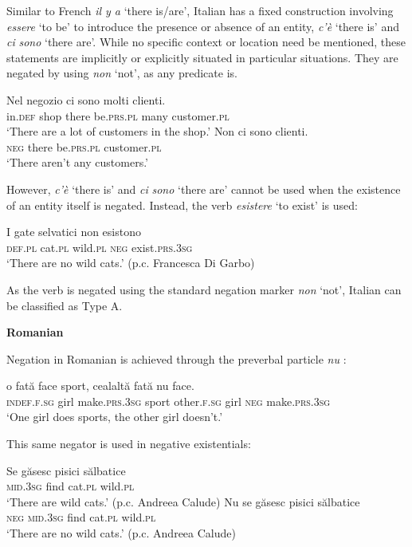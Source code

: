 ﻿\documentclass[output=paper]{langsci/langscibook}
\begin{document}
\begin{unindented}
Similar to French \textit{il y a} `there is/are', Italian has a fixed construction involving \textit{essere} `to be' to introduce the presence or absence of an entity, \textit{c’è} `there is' and \textit{ci} \textit{sono} `there are'. While no specific context or location need be mentioned, these statements are implicitly or explicitly situated in particular situations. They are negated by using \textit{non} `not', as any predicate is. 
%
\begin{exe}\ex \gll
Nel negozio ci sono molti clienti.  \\
in.\textsc{def} shop there be.\textsc{prs.pl} many customer.\textsc{pl} \\
    \glt `There are a lot of customers in the shop.'  \citet[32]{PeyronelHiggins2006}
\ex \gll Non ci sono clienti.  \\
\textsc{neg} there be.\textsc{prs.pl} customer.\textsc{pl} \\
    \glt `There aren't any customers.' \citet[33]{PeyronelHiggins2006}
    \end{exe}

However, \textit{c’è} `there is' and \textit{ci} \textit{sono} `there are' cannot be used when the existence of an entity itself is negated. Instead, the verb \textit{esistere} `to exist' is used:
%
\begin{exe}\ex \gll I gate selvatici non esistono \\
\textsc{def.pl} cat.\textsc{pl} wild.\textsc{pl} \textsc{neg} exist.\textsc{prs.3sg} \\
    \glt `There are no wild cats.' (p.c. Francesca Di Garbo)
    \end{exe} 

As the verb is negated using the standard negation marker \textit{non} `not', Italian can be classified as Type A.  

\textbf{Romanian}

Negation in Romanian is achieved through the preverbal particle \textit{nu}
\parencite[see][]{Gonczol2008}:
%
\begin{exe}\ex \gll o fată face sport, cealaltă fată nu face.  \\
\textsc{indef.f.sg} girl make.\textsc{prs.3sg} sport other.\textsc{f.sg} girl \textsc{neg} make.\textsc{prs.3sg} \\
    \glt `One girl does sports, the other girl doesn't.' \parencite[36]{Gonczol2008}
    \end{exe}

This same negator is used in negative existentials:
%
\begin{exe}\ex \gll Se găsesc pisici sălbatice   \\
\textsc{mid.3sg} find cat.\textsc{pl} wild.\textsc{pl} \\
    \glt `There are wild cats.' (p.c. Andreea Calude)
\ex \gll Nu se găsesc pisici sălbatice \\
\textsc{neg} \textsc{mid.3sg} find cat.\textsc{pl} wild.\textsc{pl} \\
    \glt `There are no wild cats.' (p.c. Andreea Calude)
    \end{exe}


\end{unindented}
\end{document}
